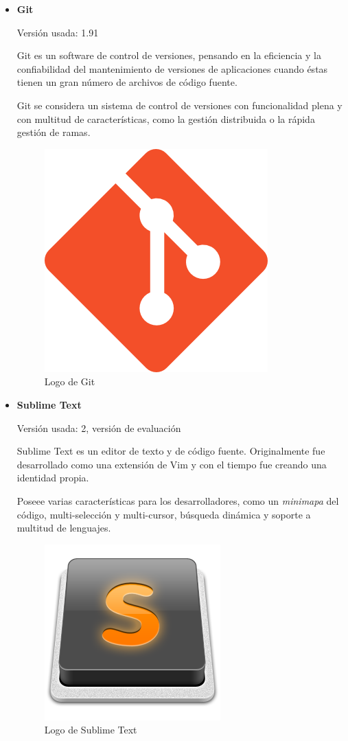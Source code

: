 \begin{itemize}
	\item \textbf{Git}
			
		Versión usada: 1.91
		
	Git \cite{git} es un software de control de versiones, pensando en la eficiencia y la confiabilidad del mantenimiento de versiones de aplicaciones cuando éstas tienen un gran número de archivos de código fuente. 

	Git se considera un sistema de control de versiones con funcionalidad plena y con multitud de características, como la gestión distribuida o la rápida gestión de ramas. 

	\bigskip
	\begin{figure}[h]
		\centering
		\includegraphics[width=0.3\linewidth]{../images/gitlogo}
		\caption[Logo de Git]{Logo de Git}
		\label{fig:gitlogo}
	\end{figure}
				
	\item \textbf{Sublime Text}
			
	Versión usada: 2, versión de evaluación
		
	Sublime Text \cite{sublimetext} es un editor de texto y de código fuente. Originalmente fue desarrollado como una extensión de Vim y con el tiempo fue creando una identidad propia.

	Poseee varias características para los desarrolladores, como un \textit{minimapa} del código, multi-selección y multi-cursor, búsqueda dinámica y soporte a multitud de lenguajes.


	\bigskip
	\begin{figure}[h]
		\centering
		\includegraphics[width=0.3\linewidth]{../images/sublimetextlogo}
		\caption[Logo de Sublime Text]{Logo de Sublime Text}
		\label{fig:sublimetextlogo}
	\end{figure}
				

\end{itemize}
